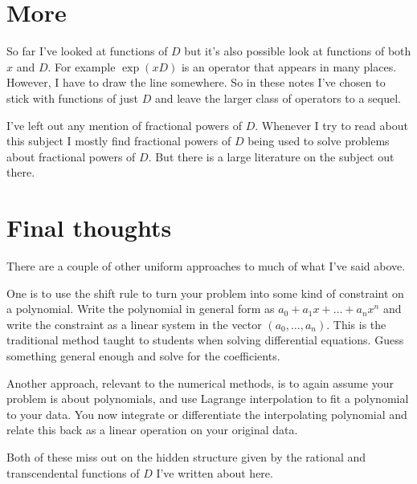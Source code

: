 \documentclass[a4paper]{article}
\theoremstyle{definition}
\begin{document}
\section{More}
So far I've looked at functions of $D$ but it's also possible look at functions of both $x$ and $D$.
For example $\exp(xD)$ is an operator that appears in many places.
However, I have to draw the line somewhere.
So in these notes I've chosen to stick with functions of just $D$ and leave the larger class of operators to a sequel.

I've left out any mention of fractional powers of $D$.
Whenever I try to read about this subject I mostly find fractional powers of $D$ being used to solve problems about fractional powers of $D$.
But there is a large literature on the subject out there.

\section{Final thoughts}
There are a couple of other uniform approaches to much of what I've said above.

One is to use the shift rule to turn your problem into some kind of constraint on a polynomial.
Write the polynomial in general form as $a_0+a_1x+\ldots+a_nx^n$ and write the constraint as a linear system in the vector $(a_0,\ldots,a_n)$.
This is the traditional method taught to students when solving differential equations.
Guess something general enough and solve for the coefficients.

Another approach, relevant to the numerical methods, is to again assume your problem is about polynomials, and use Lagrange interpolation to fit a polynomial to your data.
You now integrate or differentiate the interpolating polynomial and relate this back as a linear operation on your original data.

Both of these miss out on the hidden structure given by the rational and transcendental functions of $D$ I've written about here.



\end{document}
